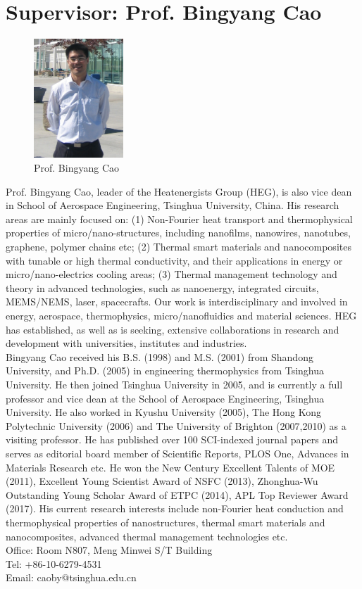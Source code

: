 \section*{Supervisor: Prof. Bingyang Cao}
\begin{figure}[htbp!] 
\centering    
\includegraphics[width=0.3\textwidth]{Cao.png}
\caption[Prof. Bingyang Cao]{Prof. Bingyang Cao}
\end{figure}
Prof. Bingyang Cao, leader of the Heatenergists Group (HEG), is also vice dean in School of Aerospace Engineering, Tsinghua University, China. His research areas are mainly focused on: (1) Non-Fourier heat transport and thermophysical properties of micro/nano-structures, including nanofilms, nanowires, nanotubes, graphene, polymer chains etc; (2) Thermal smart materials and nanocomposites with tunable or high thermal conductivity, and their applications in energy or micro/nano-electrics cooling areas; (3) Thermal management technology and theory in advanced technologies, such as nanoenergy, integrated circuits, MEMS/NEMS, laser, spacecrafts. Our work is interdisciplinary and involved in energy, aerospace, thermophysics, micro/nanofluidics and material sciences. HEG has established, as well as is seeking, extensive collaborations in research and development with universities, institutes and industries.\\
Bingyang Cao received his B.S. (1998) and M.S. (2001) from Shandong University, and Ph.D. (2005) in engineering thermophysics from Tsinghua University. He then joined Tsinghua University in 2005, and is currently a full professor and vice dean at the School of Aerospace Engineering, Tsinghua University. He also worked in Kyushu University (2005), The Hong Kong Polytechnic University (2006) and The University of Brighton (2007,2010) as a visiting professor. He has published over 100 SCI-indexed journal papers and serves as editorial board member of Scientific Reports, PLOS One, Advances in Materials Research etc. He won the New Century Excellent Talents of MOE (2011), Excellent Young Scientist Award of NSFC (2013), Zhonghua-Wu Outstanding Young Scholar Award of ETPC (2014), APL Top Reviewer Award (2017). His current research interests include non-Fourier heat conduction and thermophysical properties of nanostructures, thermal smart materials and nanocomposites, advanced thermal management technologies etc.\\
Office: Room N807, Meng Minwei S/T Building\\
Tel: +86-10-6279-4531\\
Email: caoby@tsinghua.edu.cn\\
